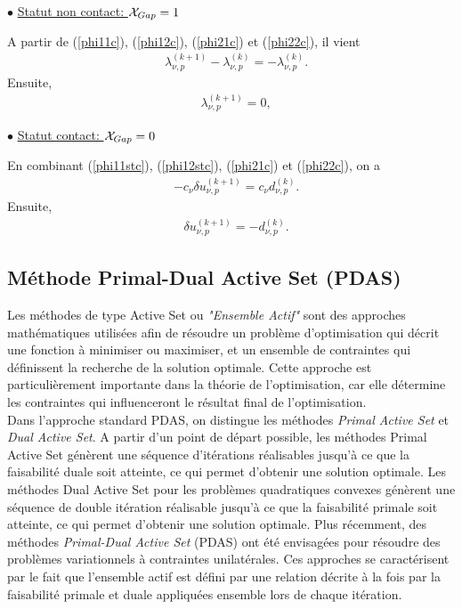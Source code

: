 $\bullet$ \underline{Statut non contact: ${\cal X}_{Gap} =1$}

\noindent A partir de (\ref{phi11c}), (\ref{phi12c}), (\ref{phi21c}) et (\ref{phi22c}), il vient
\begin{align}
&\lambda_{\nu, p}^{(k+1)}-\lambda_{\nu, p}^{(k)}=-\lambda_{\nu, p}^{(k)}.
\end{align}
Ensuite,
\begin{align}
&\lambda_{\nu, p}^{(k+1)}=0,\label{lambdanukp1}
\end{align}

$\bullet$ \underline{Statut contact: ${\cal X}_{Gap} =0$}

\noindent En combinant (\ref{phi11stc}),  (\ref{phi12stc}), (\ref{phi21c}) et (\ref{phi22c}), on a
\begin{align}
&-c_\nu \delta u^{(k+1)}_{\nu,p}=c_{\nu}d_{\nu, p}^{(k)}.
\end{align}
Ensuite,
\begin{align}
&\delta u^{(k+1)}_{\nu,p} = -d^{(k)}_{\nu,p}.\label{unukp1}
\end{align}
 
\subsection{Méthode Primal-Dual Active Set (PDAS)}

Les méthodes de type Active Set ou \textit{"Ensemble Actif"} sont des approches mathématiques utilisées afin de résoudre un problème d'optimisation qui décrit une fonction à minimiser ou maximiser, et un ensemble de contraintes qui définissent la recherche de la solution optimale. Cette approche est particulièrement importante dans la théorie de l'optimisation, car elle détermine les contraintes qui influenceront le résultat final de l'optimisation.\\
Dans l'approche standard PDAS, on distingue les méthodes \textit{Primal Active Set} et \textit{Dual Active Set}. A partir d'un point de départ possible, les méthodes Primal Active Set génèrent une séquence d’itérations réalisables jusqu’à ce que la faisabilité duale soit atteinte, ce qui permet d’obtenir une solution optimale. Les méthodes Dual Active Set pour les problèmes quadratiques convexes génèrent une séquence de double itération réalisable jusqu'à ce que la faisabilité primale soit atteinte, ce qui permet d'obtenir une solution optimale. Plus récemment, des méthodes \textit{Primal-Dual Active Set} (PDAS) ont été envisagées pour résoudre des problèmes variationnels à contraintes unilatérales. Ces approches se caractérisent par le fait que l'ensemble actif est défini par une relation décrite à la fois par la faisabilité primale et duale appliquées ensemble lors de chaque itération.\\

